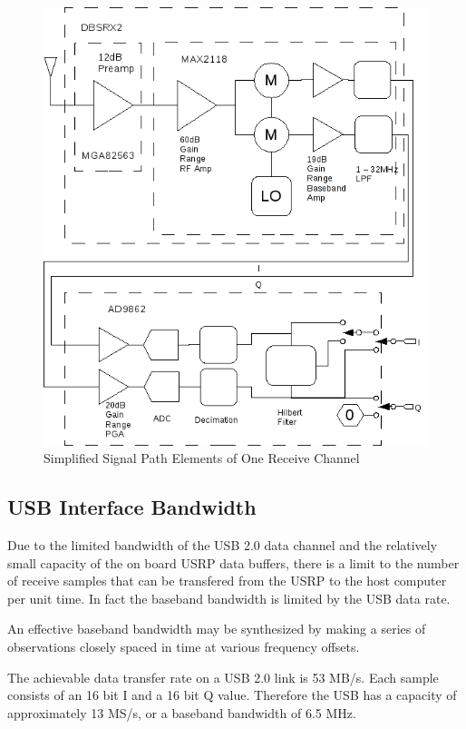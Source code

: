 \documentclass[a4paper]{report}
\numberwithin{equation}{chapter}
\begin{document}
\begin{figure}
\centering 
\includegraphics{Passive-Weather-Radar-Theory-fig-07.png}
\caption[Simplified Signal Path Elements of One Receive Channel]{Simplified Signal Path Elements of One Receive Channel}
\label{fig:07}
\end{figure}

\subsection[USB Interface Bandwidth]{USB Interface Bandwidth}
\label{sub:USB1}
Due to the limited bandwidth of the USB 2.0 data channel and the relatively small capacity of the on board USRP data buffers, there is a limit to the number of receive samples that can be transfered from the USRP to the host computer per unit time. In fact the baseband bandwidth is limited by the USB data rate.

\bigskip

An effective baseband bandwidth may be synthesized by making a series of observations closely spaced in time at various frequency offsets.

\bigskip

The achievable data transfer rate on a USB 2.0 link is 53 MB/s. Each sample consists of an 16 bit I and a 16 bit Q value. Therefore the USB has a capacity of approximately 13 MS/s, or a baseband bandwidth of 6.5 MHz.
\end{document}
